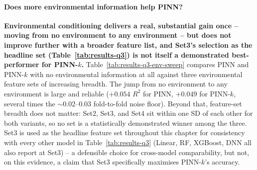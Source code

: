 \paragraph*{Does more environmental information help PINN?}
\textbf{Environmental conditioning delivers a real, substantial gain once -- moving from no
environment to any environment -- but does not improve further with a broader feature list,
and Set3's selection as the headline set (Table~\ref{tab:results-q3}) is not itself a
demonstrated best-performer for PINN-$k$.}
Table~\ref{tab:results-q3-env-sweep} compares PINN and PINN-$k$ with no environmental
information at all against three environmental feature sets of increasing breadth. The jump
from no environment to any environment is large and reliable ($+0.054$ $R^2$ for PINN,
$+0.049$ for PINN-$k$, several times the $\sim$0.02--0.03 fold-to-fold noise floor). Beyond
that, feature-set breadth does not matter: Set2, Set3, and Set4 sit within one SD of each
other for both variants, so no set is a statistically demonstrated winner among the three.
Set3 is used as the headline feature set throughout this chapter for consistency with every
other model in Table~\ref{tab:results-q3} (Linear, RF, XGBoost, DNN all also report at
Set3) -- a defensible choice for cross-model comparability, but not, on this evidence, a
claim that Set3 specifically maximises PINN-$k$'s accuracy.
